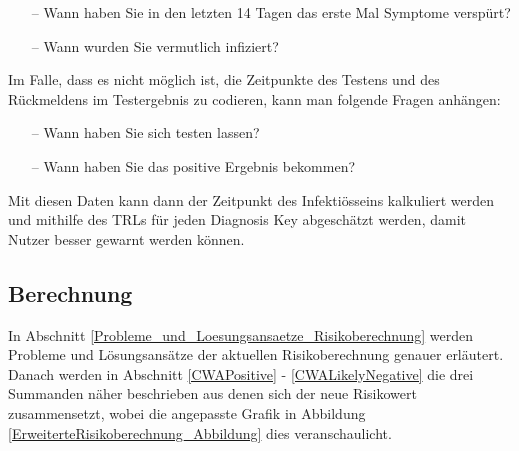 \documentclass[conference,compsoc]{IEEEtran}
\begin{document}
\begin{itemize}
	\item[--] Wann haben Sie in den letzten 14 Tagen das erste Mal Symptome verspürt?
	\item[--] Wann wurden Sie vermutlich infiziert?
\end{itemize}

Im Falle, dass es nicht möglich ist, die Zeitpunkte des Testens und des Rückmeldens im Testergebnis zu codieren, kann man folgende Fragen anhängen:

\begin{itemize}
	\item[--] Wann haben Sie sich testen lassen?
	\item[--] Wann haben Sie das positive Ergebnis bekommen?
\end{itemize} 
	
Mit diesen Daten kann dann der Zeitpunkt des Infektiösseins kalkuliert werden und mithilfe des TRLs für jeden Diagnosis Key abgeschätzt werden,
damit Nutzer besser gewarnt werden können.

\subsection{Berechnung}
\label{Berechnung}

In Abschnitt \ref{Probleme_und_Loesungsansaetze_Risikoberechnung} werden Probleme und Lösungsansätze der aktuellen Risikoberechnung genauer erläutert.
Danach werden in Abschnitt \ref{CWAPositive} - \ref{CWALikelyNegative} die drei Summanden näher beschrieben aus denen sich der neue Risikowert zusammensetzt,
wobei die angepasste Grafik in Abbildung \ref{ErweiterteRisikoberechnung_Abbildung} dies veranschaulicht.
\end{document}
